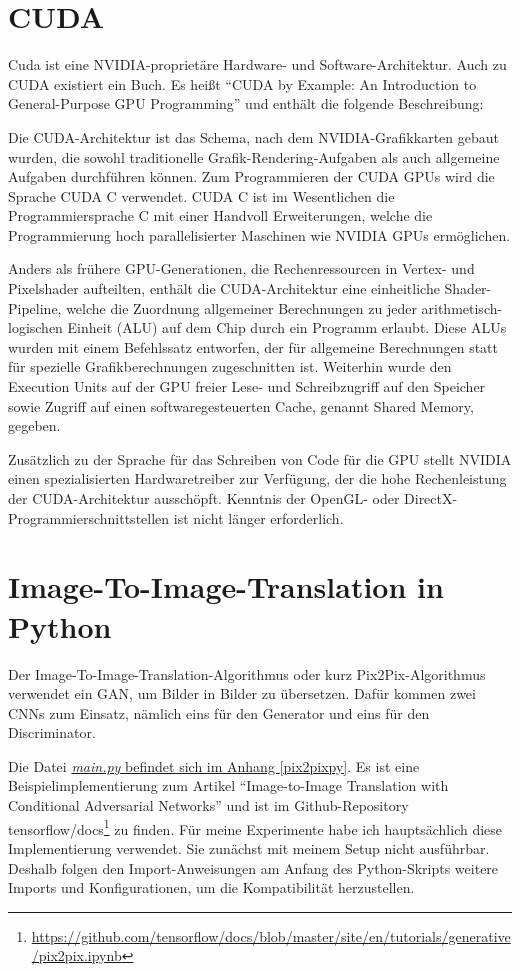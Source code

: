 \section{CUDA}
\label{sec:cuda}
Cuda ist eine NVIDIA-proprietäre Hardware- und Software-Architektur. Auch zu CUDA existiert ein Buch. Es heißt ``CUDA by Example: An Introduction to General-Purpose GPU Programming'' \cite{sanders2010cuda} und enthält die folgende Beschreibung:

Die CUDA-Architektur ist das Schema, nach dem NVIDIA-Grafikkarten gebaut wurden, die sowohl traditionelle Grafik-Rendering-Aufgaben als auch allgemeine Aufgaben durchführen können. Zum Programmieren der CUDA GPUs wird die Sprache CUDA C verwendet. CUDA C ist im Wesentlichen die Programmiersprache C mit einer Handvoll Erweiterungen, welche die Programmierung hoch parallelisierter Maschinen wie NVIDIA GPUs ermöglichen.

Anders als frühere GPU-Generationen, die Rechenressourcen in Vertex- und Pixelshader aufteilten, enthält die CUDA-Architektur eine einheitliche Shader-Pipeline, welche die Zuordnung allgemeiner Berechnungen zu jeder arithmetisch-logischen Einheit (ALU) auf dem Chip durch ein Programm erlaubt. Diese ALUs wurden mit einem Befehlssatz entworfen, der für allgemeine Berechnungen statt für spezielle Grafikberechnungen zugeschnitten ist. Weiterhin wurde den Execution Units auf der GPU freier Lese- und Schreibzugriff auf den Speicher sowie Zugriff auf einen softwaregesteuerten Cache, genannt Shared Memory, gegeben.

Zusätzlich zu der Sprache für das Schreiben von Code für die GPU stellt NVIDIA einen spezialisierten Hardwaretreiber zur Verfügung, der die hohe Rechenleistung der CUDA-Architektur ausschöpft. Kenntnis der OpenGL- oder DirectX-Programmierschnittstellen ist nicht länger erforderlich. \cite{sanders2010cuda}

\section{Image-To-Image-Translation in Python}
\label{sec:pix2pix}
Der Image-To-Image-Translation-Algorithmus oder kurz Pix2Pix-Algorithmus verwendet ein GAN, um Bilder in Bilder zu übersetzen. Dafür kommen zwei CNNs zum Einsatz, nämlich eins für den Generator und eins für den Discriminator. \cite{isola2018imagetoimage}

Die Datei \hyperref[pix2pixpy]{\textit{\url{main.py}} befindet sich im Anhang \ref{pix2pixpy}}. Es ist eine Beispielimplementierung zum Artikel ``Image-to-Image Translation with Conditional Adversarial Networks'' \cite{isola2018imagetoimage} und ist im Github-Repository tensorflow/docs\footnote{\href{https://github.com/tensorflow/docs/blob/master/site/en/tutorials/generative/pix2pix.ipynb}{https://github.com/tensorflow/docs/blob/master/site/en/tutorials/generative/pix2pix.ipynb}} zu finden. Für meine Experimente habe ich hauptsächlich diese Implementierung verwendet. Sie zunächst mit meinem Setup nicht ausführbar. Deshalb folgen den Import-Anweisungen am Anfang des Python-Skripts weitere Imports und Konfigurationen, um die Kompatibilität herzustellen.

